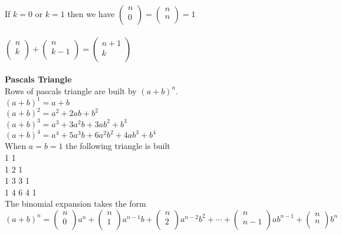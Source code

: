 \documentclass[14pt]{extreport}
\begin{document}
  If $k=0$ or $k=1$ then we have 
  $\begin{pmatrix}
      n\\
      0\\
  \end{pmatrix} = 
  \begin{pmatrix}
      n\\
      n\\
  \end{pmatrix} = 1
$\\\\

$
\begin{pmatrix}
    n\\
    k\\    
\end{pmatrix}
+
\begin{pmatrix}
    n\\
    k-1\\    
\end{pmatrix}
=
\begin{pmatrix}
    n+1\\
    k\\    
\end{pmatrix}
$\\\\

\textbf{Pascals Triangle}\\
Rows of pascals triangle are built by $(a+b)^n$.\\
$(a+b)^1 = a+b$\\
$(a+b)^2 = a^2 + 2ab + b^2$\\
$(a+b)^3 = a^3 + 3a^2b + 3ab^2 + b^3$\\
$(a+b)^4 = a^4 + 5a^3b + 6a^2b^2 + 4ab^3 + b^4$\\
When $a = b = 1$ the following triangle is built\\
       1 1\\
      1 2 1\\
     1 3 3 1\\
    1 4 6 4 1\\

The binomial expansion takes the form $(a + b)^n = \begin{pmatrix} n \\ 0 \\\end{pmatrix} a^n + \begin{pmatrix} n \\ 1 \\\end{pmatrix} a^{n-1}b + \begin{pmatrix} n \\ 2 \\\end{pmatrix} a^{n-2}b^2 +
\cdots + \begin{pmatrix} n \\ n-1 \\\end{pmatrix}ab^{n-1} + \begin{pmatrix} n \\ n \\\end{pmatrix}b^n$\\\\
\end{document}
